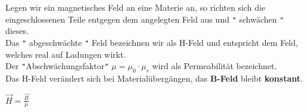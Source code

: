 	\begin{center}
	\end{center}
	\iend

\newpage
	\beginip
	Legen wir ein magnetisches Feld an eine Materie an, so richten sich die eingeschlossenen Teile entgegen dem angelegten Feld aus und \texttt{"} schwächen \texttt{"} dieses. \\
	Das \texttt{"} abgeschwächte \texttt{"} Feld bezeichnen wir als H-Feld und entspricht dem Feld, welches real auf Ladungen wirkt. \\
	 Der \texttt{"}Abschwächungsfaktor\texttt{"} $\mu = \mu_0 \cdot \mu_r$ wird als Permeabilität bezeichnet. \\
	 Das H-Feld verändert sich bei Materialübergängen, das \textbf{B-Feld} bleibt \textbf{konstant}.

	\formulaBegin
	$\displaystyle \vec{H} = \frac{\vec{B}}{\mu}$
	\formulaEnd

	\begin{center}
	\end{center}
	\iend

